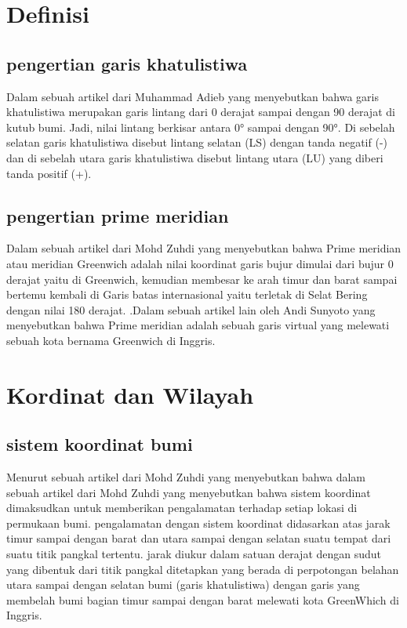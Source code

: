    
						

														   
\section {Definisi}

\subsection{pengertian garis khatulistiwa}	

	Dalam sebuah artikel dari Muhammad Adieb yang menyebutkan bahwa garis khatulistiwa merupakan garis lintang dari 0 derajat sampai dengan 90 derajat di kutub bumi. Jadi, nilai lintang berkisar antara 0° sampai dengan 90°. Di sebelah selatan garis khatulistiwa disebut lintang selatan (LS) dengan tanda negatif (-) dan di sebelah utara garis khatulistiwa disebut lintang utara (LU) yang diberi tanda positif (+)\cite{adieb2014studi}.

\subsection{pengertian prime meridian}
	
	Dalam sebuah artikel dari Mohd Zuhdi yang menyebutkan bahwa Prime meridian atau meridian Greenwich adalah nilai koordinat garis bujur dimulai dari bujur 0 derajat yaitu di Greenwich, kemudian membesar ke arah timur dan barat sampai bertemu kembali di Garis batas internasional yaitu terletak di Selat Bering dengan nilai 180 derajat. \cite {zuhdi2012sistem}.Dalam sebuah artikel lain oleh Andi Sunyoto yang menyebutkan bahwa Prime meridian adalah sebuah garis virtual yang melewati sebuah kota 
bernama Greenwich di Inggris\cite{sunyoto2009api}.

\section {Kordinat dan Wilayah}

\subsection{sistem koordinat bumi}
	
	Menurut sebuah artikel dari Mohd Zuhdi yang menyebutkan bahwa dalam sebuah artikel dari Mohd Zuhdi yang menyebutkan bahwa sistem koordinat dimaksudkan untuk memberikan pengalamatan terhadap setiap lokasi di permukaan bumi. pengalamatan dengan sistem koordinat didasarkan atas jarak timur sampai dengan barat dan utara sampai dengan selatan suatu tempat dari suatu titik pangkal tertentu. jarak diukur dalam satuan derajat dengan sudut yang dibentuk dari titik pangkal ditetapkan yang berada di perpotongan belahan utara sampai dengan selatan bumi (garis khatulistiwa) dengan garis yang membelah bumi bagian timur sampai dengan barat melewati kota GreenWhich di Inggris.

